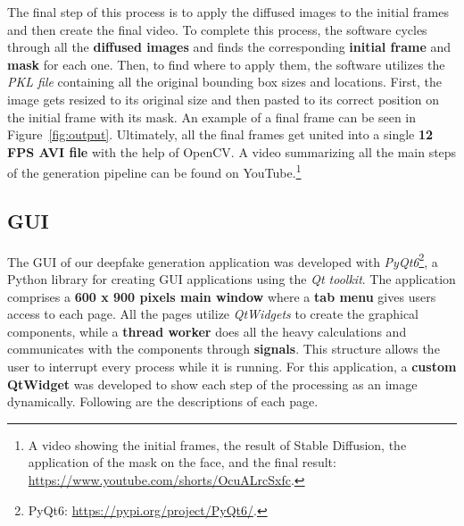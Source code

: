 \documentclass[sn-mathphys,Numbered]{sn-jnl}
\theoremstyle{thmstyleone}%
\theoremstyle{thmstyletwo}%
\theoremstyle{thmstylethree}%
\begin{document}
The final step of this process is to apply the diffused images to the initial frames and then create the final video. 
To complete this process, the software cycles through all the \textbf{diffused images}  and finds the corresponding \textbf{initial frame} and \textbf{mask} for each one. 
Then, to find where to apply them, the software utilizes the \emph{PKL file} containing all the original bounding box sizes and locations.  First, the image gets resized to its original size and then pasted  to its correct position on the initial frame with its mask. 
An example of a final frame can be seen in Figure~\ref{fig:output}.
Ultimately, all the final frames get united into a single \textbf{12 FPS AVI file} with the help of OpenCV. A video summarizing all the main steps of the generation pipeline can be found on YouTube.\footnote{A video showing the initial frames, the result of Stable Diffusion, the application of the mask on the face, and the final result: \url{https://www.youtube.com/shorts/OcuALrcSxfc}.}



\subsection{GUI}\label{sec:gui}

The GUI of our deepfake generation application was developed with \emph{PyQt6}\footnote{PyQt6: \url{https://pypi.org/project/PyQt6/}.}, 
a Python library for creating GUI applications using the \emph{Qt toolkit}.  The application comprises a \textbf{600 x 900 pixels main window} where a \textbf{tab menu} gives users access to each page.
All the pages utilize \emph{QtWidgets} to create the graphical components,  while a \textbf{thread worker} does all the heavy calculations and communicates  with the components through \textbf{signals}. 
This structure allows the user to interrupt every process while it is running.
For this application, a \textbf{custom QtWidget} was developed to show each step of the processing as an image dynamically. Following are the descriptions of each page.
\end{document}
